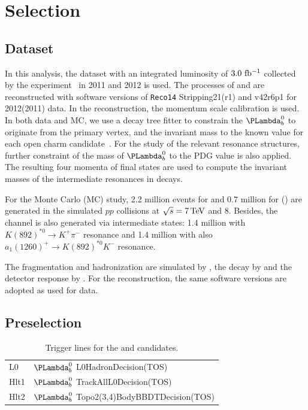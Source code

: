 
\section{\boldmath Selection}

\subsection{Dataset}
In this analysis, 
the dataset with an integrated luminosity of $3.0~\rm fb^{-1}$ collected by the \lhcb experiment~\cite{Alves:2008zz,LHCb-DP-2014-002} in 2011 and 2012 is used. 
The processes of \LbLckkpi and \LbLcDs are reconstructed  with software versions of \texttt{Reco14} Stripping21(r1) and \davinci v42r6p1 for 2012(2011) data. 
In the reconstruction, 
the momentum scale calibration is used. 
In both data and MC, 
we use a decay tree fitter to constrain the $\Lb$ to originate from the primary vertex, 
and the invariant mass  to the known value for each open charm candidate~\cite{PDG}. 
For the study of the relevant resonance structures, 
further constraint of the mass of $\Lb$ to the PDG value is also applied. 
The resulting four momenta of final states are used to compute the invariant masses of the intermediate resonances in \LbLckkpi decays. 

For the Monte Carlo (MC) study, 
2.2  million events for \LbLckkpi 
and 0.7 million for \LbLcDs(\Dskkpi) are generated in the simulated $pp$ collisions at $\sqrt{s}=7\text{\,Te\kern -0.1em V}$ and 8\tev. 
Besides, 
the \LbLckkpi channel is also generated via intermediate states: 
1.4 million with $K(892)^{*0}\to K^+\pi^-$ resonance and 1.4 million with also $a_1(1260)^+\to K(892)^{*0}K^-$ resonance. 

The fragmentation and hadronization are simulated by , 
the decay by \evtgen and the detector response by \geant. 
For the reconstruction, 
the same software versions are adopted as used for data.

\subsection{Preselection}
\begin{table}[b]
\centering
\caption{Trigger lines for the \LbLckkpi and \LbLcDs candidates.}
\vspace{0.2cm}
\begin{tabular}{ll}\hline\hline
L0&$\Lb$ L0HadronDecision(TOS) \\
Hlt1&$\Lb$ TrackAllL0Decision(TOS)\\
Hlt2&$\Lb$ Topo2(3,4)BodyBBDTDecision(TOS)\\\hline
\end{tabular}
\label{tab:trigger}
\end{table}

